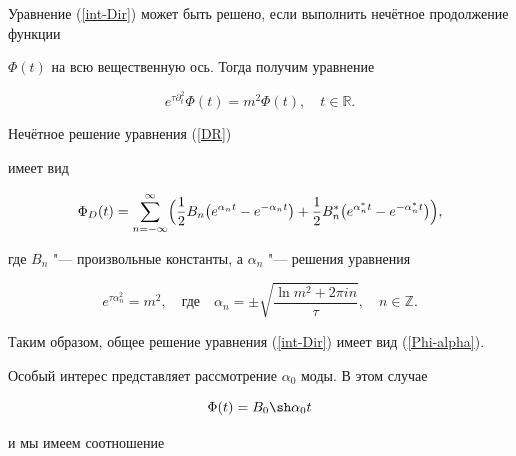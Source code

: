  Уравнение (\ref{int-Dir}) может быть решено, если выполнить нечётное продолжение функции

$\Phi(t)$ на всю вещественную ось. Тогда получим уравнение

\begin{equation}\label{DR}

e^{\tau\partial^2_t}\Phi(t)=m^2\Phi(t),\quad t\in \mathbb{R}.

\end{equation}

Нечётное решение уравнения (\ref{DR})

имеет вид

\begin{equation}

\label{Phi-alpha}

\Phi_D(t)=\sum _{n=-\infty}^{\infty} \Bigl(\frac12 B_n \bigl(e^{\alpha_nt}

-e^{-\alpha_nt}\bigr)+\frac12 B^*_n \bigl(e^{\alpha^*_nt}-e^{-\alpha^*_nt}\bigr)\Bigr),\end{equation}

где $B_n$ "--- произвольные константы, а  $\alpha_n$ "--- решения уравнения

\begin{equation*}


e^{\tau \alpha^2_n}=m^2,\quad \text{где}\quad 




 \alpha_n=\pm\sqrt{\frac{\ln m^2+2\pi in}{\tau}}, \quad  n\in \mathbb Z .

 \end{equation*}

Таким образом, общее решение уравнения (\ref{int-Dir}) имеет вид (\ref{Phi-alpha}).



Особый интерес представляет рассмотрение  $\alpha_0$ моды. В этом случае

\begin{equation*}


\Phi(t)= B_0 \sh  \alpha_0t 

\end{equation*}

и мы имеем соотношение

